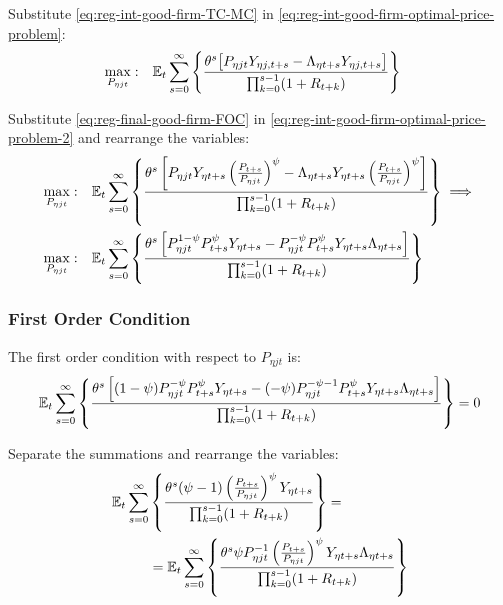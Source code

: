 \documentclass[
	thesis.tex
	]{subfiles}
\begin{document}

Substitute \ref{eq:reg-int-good-firm-TC-MC} in \ref{eq:reg-int-good-firm-optimal-price-problem}:
\begin{align}
	\label{eq:reg-int-good-firm-optimal-price-problem-2}
	\max_{P_{\eta jt}}: & \quad {\mathbb{E}_{t}} \sum_{s=0}^{\infty} \left\{ \frac{\theta^s \big[ P_{\eta jt} Y_{\eta j,t+s} - \Lambda_{\eta t+s} Y_{\eta j,t+s} \big]}{\prod_{k=0}^{s-1}(1+R_{t+k})} \right\}
\end{align}

Substitute \ref{eq:reg-final-good-firm-FOC} in \ref{eq:reg-int-good-firm-optimal-price-problem-2} and rearrange the variables:
\begin{align}
	\max_{P_{\eta jt}}: & \quad {\mathbb{E}_{t}} \sum_{s=0}^{\infty} \left\{ \frac{\theta^s \left[ P_{\eta jt} Y_{\eta t+s} \left( \frac{P_{t+s}}{P_{\eta jt}} \right)^{\psi} - \Lambda_{\eta t+s} Y_{\eta t+s} \left( \frac{P_{t+s}}{P_{\eta jt}} \right)^{\psi} \right] }{\prod_{k=0}^{s-1}(1+R_{t+k})} \right\} \implies \nonumber 
	\\
	\max_{P_{\eta jt}}: & \quad {\mathbb{E}_{t}} \sum_{s=0}^{\infty} \left\{ \frac{\theta^s \left[ P_{\eta jt}^{1-\psi} P_{t+s}^{\psi} Y_{\eta t+s} - P_{\eta jt}^{-\psi} P_{t+s}^{\psi} Y_{\eta t+s} \Lambda_{\eta t+s} \right] }{\prod_{k=0}^{s-1}(1+R_{t+k})} \right\} \nonumber
\end{align}


\subsubsection*{First Order Condition}

The first order condition with respect to $P_{\eta jt}$ is:
\begin{align}
	& \quad {\mathbb{E}_{t}} \sum_{s=0}^{\infty} \left\{ \frac{\theta^s \left[ (1-\psi) P_{\eta jt}^{-\psi} P_{t+s}^{\psi} Y_{\eta t+s} - (-\psi) P_{\eta jt}^{-\psi-1} P_{t+s}^{\psi} Y_{\eta t+s} \Lambda_{\eta t+s} \right] }{\prod_{k=0}^{s-1}(1+R_{t+k})} \right\} = 0 \nonumber
\end{align}


Separate the summations and rearrange the variables:
\begin{align}
	\begin{split}
	{\mathbb{E}_{t}} \sum_{s=0}^{\infty} &\left\{ \frac{\theta^s (\psi-1) \left( \frac{P_{t+s}} {P_{\eta jt}} \right)^{\psi} Y_{\eta t+s}} {\prod_{k=0}^{s-1} (1+R_{t+k})} \right\} = \\
	&= {\mathbb{E}_{t}} \sum_{s=0}^{\infty} \left\{ \frac{\theta^s \psi P_{\eta jt}^{-1} \left( \frac{P_{t+s}} {P_{\eta jt}} \right)^{\psi} Y_{\eta t+s} \Lambda_{\eta t+s} }{\prod_{k=0}^{s-1}(1+R_{t+k})} \right\} \label{eq:reg-int-good-firm-optimal-price-FOC}
	\end{split}
\end{align}
\end{document}
